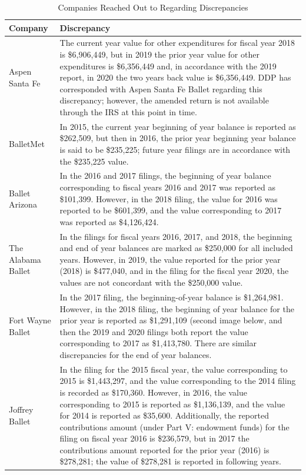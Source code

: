 \documentclass[Dance Data
Project,article,submit,moreauthors,pdftex]{mdpi}
\begin{document}
\begin{table}[H]

\caption{\label{tab:unnamed-chunk-1}\label{table:discrep}Companies Reached Out to Regarding Discrepancies}
\centering
\begin{tabular}[t]{l>{\raggedright\arraybackslash}p{35em}}
\toprule
Company & Discrepancy\\
\midrule
Aspen Santa Fe & The current year value for other expenditures for fiscal year 2018 is \$6,906,449, but in 2019 the prior year value for other expenditures is \$6,356,449 and, in accordance with the 2019 report, in 2020 the two years back value is \$6,356,449. DDP has corresponded with Aspen Santa Fe Ballet regarding this discrepancy; however, the amended return is not available through the IRS at this point in time.\\
\addlinespace
BalletMet & In 2015, the current year beginning of year balance is reported as \$262,509, but then in 2016, the prior year beginning year balance is said to be \$235,225; future year filings are in accordance with the \$235,225 value.\\
\addlinespace
Ballet Arizona & In the 2016 and 2017 filings, the beginning of year balance corresponding to fiscal years 2016 and 2017 was reported as \$101,399. However, in the 2018 filing, the value for 2016 was reported to be \$601,399, and the value corresponding to 2017 was reported as \$4,126,424.\\
\addlinespace
The Alabama Ballet & In the filings for fiscal years 2016, 2017, and 2018,  the beginning and end of year balances are marked as \$250,000 for all included years. However, in 2019, the value reported for the prior year (2018)  is \$477,040, and in the filing for the fiscal year 2020, the values are not concordant with the \$250,000 value.\\
\addlinespace
Fort Wayne Ballet & In the 2017 filing, the beginning-of-year balance is \$1,264,981. However, in the 2018 filing, the beginning of year balance for the prior year is reported as \$1,291,109 (second image below, and then the 2019 and 2020 filings both report the value corresponding to 2017 as \$1,413,780. There are similar discrepancies for the end of year balances.\\
\addlinespace
Joffrey Ballet & In the filing for the 2015 fiscal year, the value corresponding to 2015 is \$1,443,297, and the value corresponding to the 2014 filing is recorded as \$170,360.  However, in 2016, the value corresponding to 2015 is reported as \$1,136,139, and the value for 2014 is reported as \$35,600. Additionally, the reported contributions amount (under Part V: endowment funds)  for the filing on fiscal year 2016 is \$236,579, but in 2017 the contributions amount reported for the prior year (2016) is \$278,281; the value of \$278,281 is reported in following years.\\

\end{tabular}
\end{table}
\end{document}
